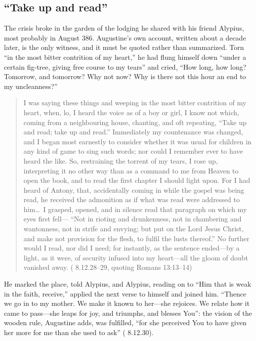 \subsection{``Take up and read''}

The crisis broke in the garden of the lodging he shared with his friend
Alypius, most probably in August 386. Augustine's own account, written about
a decade later, is the only witness, and it must be quoted rather than
summarized. Torn ``in the most bitter contrition of my heart,'' he had flung
himself down ``under a certain fig-tree, giving free course to my tears''
and cried, ``How long, how long? Tomorrow, and tomorrow? Why not now? Why is
there not this hour an end to my uncleanness?''

\begin{quote}
I was saying these things and weeping in the most bitter contrition of my
heart, when, lo, I heard the voice as of a boy or girl, I know not which,
coming from a neighbouring house, chanting, and oft repeating, ``Take up and
read; take up and read.'' Immediately my countenance was changed, and I began
most earnestly to consider whether it was usual for children in any kind of
game to sing such words; nor could I remember ever to have heard the like.
So, restraining the torrent of my tears, I rose up, interpreting it no other
way than as a command to me from Heaven to open the book, and to read the
first chapter I should light upon. For I had heard of Antony, that,
accidentally coming in while the gospel was being read, he received the
admonition as if what was read were addressed to him\ldots\ I grasped,
opened, and in silence read that paragraph on which my eyes first fell---
``Not in rioting and drunkenness, not in chambering and wantonness, not in
strife and envying; but put on the Lord Jesus Christ, and make not provision
for the flesh, to fulfil the lusts thereof.'' No further would I read, nor
did I need; for instantly, as the sentence ended---by a light, as it were,
of security infused into my heart---all the gloom of doubt vanished away.
( 8.12.28--29, quoting Romans 13:13--14)
\end{quote}

He marked the place, told Alypius, and Alypius, reading on to ``Him that is
weak in the faith, receive,'' applied the next verse to himself and joined
him. ``Thence we go in to my mother. We make it known to her---she rejoices.
We relate how it came to pass---she leaps for joy, and triumphs, and blesses
You'': the vision of the wooden rule, Augustine adds, was fulfilled, ``for
she perceived You to have given her more for me than she used to ask''
( 8.12.30).

